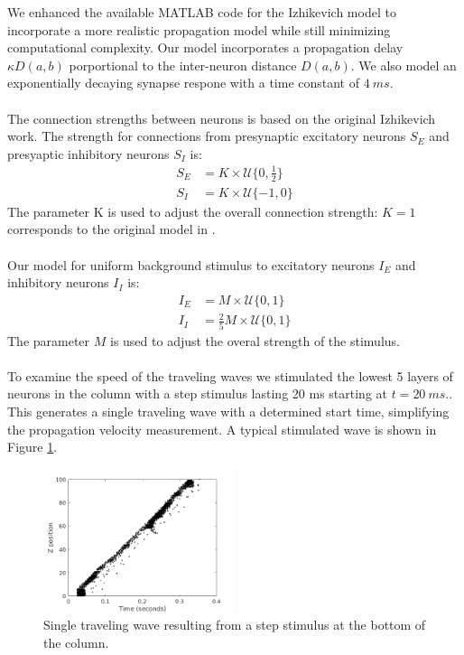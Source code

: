 \documentclass[a4paper,11pt]{article}
\begin{document}
We enhanced the available MATLAB code for the Izhikevich model to incorporate a more realistic propagation model while still minimizing computational complexity.
Our model incorporates a propagation delay $\kappa D(a,b)$ porportional to the inter-neuron distance $D(a,b)$. 
We also model an exponentially decaying synapse respone with a time constant of $4~ms$.
\\ \\
The connection strengths between neurons is based on the original Izhikevich work.
The strength for connections from presynaptic excitatory neurons $S_E$ and presyaptic inhibitory neurons $S_I$ is:
\begin{align}
 S_E &= K \times \mathcal{U}\{0,\frac{1}{2} \} \\
 S_I &= K \times \mathcal{U}\{-1,0 \} 
\end{align}
The parameter K is used to adjust the overall connection strength: $K=1$ corresponds to the original model in \cite{izzy_code}. 
\\ \\
Our model for uniform background stimulus to excitatory neurons $I_E$ and inhibitory neurons $I_I$ is: 
\begin{align}
 I_E &= M \times \mathcal{U}\{0,1 \} \\
 I_I &= \frac{2}{5} M \times \mathcal{U}\{0,1 \}
\end{align}
The parameter $M$ is used to adjust the overal strength of the stimulus.
\\ \\
To examine the speed of the traveling waves we stimulated the lowest 5 layers of neurons in the column with a step stimulus lasting 20 ms starting at $t=20~ms$..
This generates a single traveling wave with a determined start time, simplifying the propagation velocity measurement.
A typical stimulated wave is shown in Figure \ref{fig:wave_example}.
\begin{figure}[!htb]
 \caption{Single traveling wave resulting from a step stimulus at the bottom of the column.}
 \label{fig:wave_example}
 \centering
   \includegraphics[width=0.5\textwidth]{fig/TypicalWave}
\end{figure}
\end{document}
